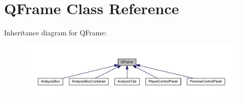\hypertarget{classGUI_1_1QFrame}{}\section{Q\+Frame Class Reference}
\label{classGUI_1_1QFrame}


Inheritance diagram for Q\+Frame\+:
\nopagebreak
\begin{figure}[H]
\begin{center}
\leavevmode
\includegraphics[width=350pt]{classGUI_1_1QFrame__inherit__graph}
\end{center}
\end{figure}
